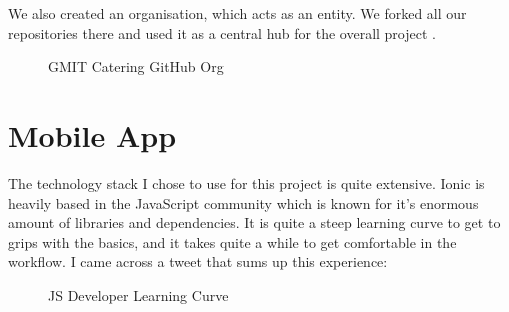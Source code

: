 We also created an organisation, which acts as an entity.
We forked all our repositories there and used it as a central hub for the overall project \cite{github_org}.
\begin{figure}[H] 
	\caption{GMIT Catering GitHub Org}
	\label{fig:speciation}
\end{figure}

\pagebreak
  \section{Mobile App} %
The technology stack I chose to use for this project is quite extensive.  
Ionic is heavily based in the JavaScript community which is known for it's enormous amount of libraries and dependencies.
It is quite a steep learning curve to get to grips with the basics, and it takes quite a while to get comfortable in the workflow.
I came across a tweet that sums up this experience:
\begin{figure}[H] 
	\caption{JS Developer Learning Curve}
	\label{fig:speciation}
\end{figure}


